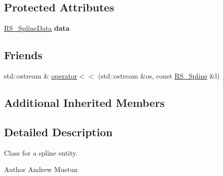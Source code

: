 \subsection*{Protected Attributes}
\begin{DoxyCompactItemize}
\item 
\hypertarget{classRS__Spline_a81e45fc8f7f6131c527895ba7e6a814a}{\hyperlink{classRS__SplineData}{R\-S\-\_\-\-Spline\-Data} {\bfseries data}}\label{classRS__Spline_a81e45fc8f7f6131c527895ba7e6a814a}

\end{DoxyCompactItemize}
\subsection*{Friends}
\begin{DoxyCompactItemize}
\item 
std\-::ostream \& \hyperlink{classRS__Spline_a5848002e0b1adf644a4d2bc6474c7d0b}{operator$<$$<$} (std\-::ostream \&os, const \hyperlink{classRS__Spline}{R\-S\-\_\-\-Spline} \&l)
\end{DoxyCompactItemize}
\subsection*{Additional Inherited Members}


\subsection{Detailed Description}
Class for a spline entity.

\begin{DoxyAuthor}{Author}
Andrew Mustun 
\end{DoxyAuthor}


